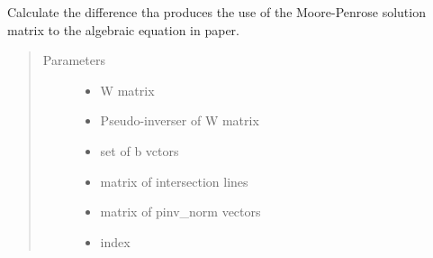 \documentclass[letterpaper,12pt,english]{sphinxmanual}
\begin{document}
\begin{fulllineitems}
\label{\detokenize{functions:functions.mooore_penrose_solution_ptr}}
Calculate the difference tha produces the use of the Moore-Penrose solution matrix to the algebraic equation in     paper.
\begin{quote}\begin{description}
\item[{Parameters}] \leavevmode\begin{itemize}
\item {} 
 \textendash{} W matrix

\item {} 
 \textendash{} Pseudo-inverser of W matrix

\item {} 
 \textendash{} set of b vctors

\item {} 
 \textendash{} matrix of intersection lines

\item {} 
 \textendash{} matrix of pinv\_norm vectors

\item {} 
 \textendash{} index

\end{itemize}

\end{description}\end{quote}

\end{fulllineitems}

\end{document}
